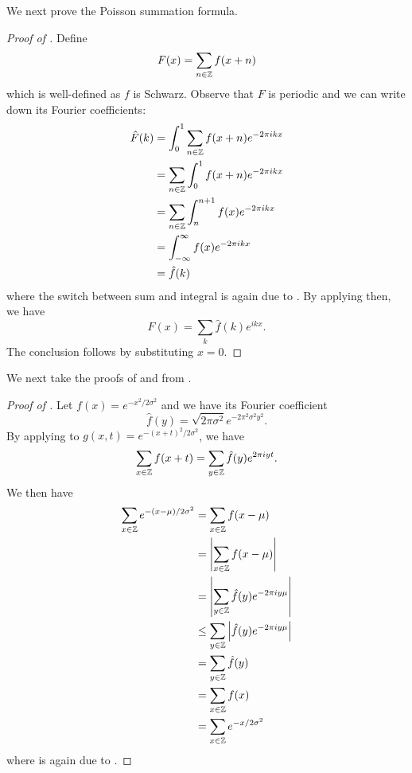 \documentclass{article}
\begin{document}
We next prove the Poisson summation formula.

\begin{proof}[Proof of ]
	Define
	\begin{equation}
		F(x)=\sum_{n\in\mathbb{Z}}f(x+n)
	\end{equation}
	which is well-defined as $f$ is Schwarz.
	Observe that $F$ is periodic and we can write down its Fourier coefficients:
	\begin{align}
		\hat{F}(k)&=\int_0^1 \sum_{n\in\mathbb{Z}} f(x+n)e^{-2\pi ikx} \\
		&=\sum_{n\in\mathbb{Z}} \int_0^1 f(x+n)e^{-2\pi ikx} \\
		&=\sum_{n\in\mathbb{Z}} \int_n^{n+1} f(x)e^{-2\pi ikx} \\
		&=\int_{-\infty}^{\infty} f(x)e^{-2\pi ikx} \\
		&=\hat{f}(k)
	\end{align}
	where the switch between sum and integral is again due to .
	By applying  then, we have
	\begin{equation}
		F(x)=\sum_k \hat{f}(k) e^{ikx}.
	\end{equation}
	The conclusion follows by substituting $x=0$.
\end{proof}

We next take the proofs of  and  from \cite{discrete-gaussian}.

\begin{proof}[Proof of ]
	Let $f(x)=e^{-x^2/2\sigma^2}$ and we have its Fourier coefficient
	\begin{equation}
		\hat{f}(y)=\sqrt{2\pi\sigma^2}e^{-2\pi^2\sigma^2y^2}.
	\end{equation}
	By applying  to $g(x, t)=e^{-(x+t)^2/2\sigma^2}$,
	we have
	\begin{equation}
		\sum_{x\in\mathbb{Z}}f(x+t)=\sum_{y\in\mathbb{Z}}\hat{f}(y)e^{2\pi iyt}.
	\end{equation}
	We then have
	\begin{align}
		\sum_{x\in\mathbb{Z}}e^{-(x-\mu)/2\sigma^2}
		&=\sum_{x\in\mathbb{Z}}f(x-\mu)\\
		&=\abs{\sum_{x\in\mathbb{Z}}f(x-\mu)} \\
		&=\abs{\sum_{y\in\mathbb{Z}}\hat{f}(y)e^{-2\pi iy\mu}} \\
		&\leq\sum_{y\in\mathbb{Z}}\abs{\hat{f}(y)e^{-2\pi iy\mu}} \\
		&=\sum_{y\in\mathbb{Z}}\hat{f}(y) \\
		&=\sum_{x\in\mathbb{Z}}f(x) \label{eq:use-Poisson} \\
		&=\sum_{x\in\mathbb{Z}}e^{-x/2\sigma^2}
	\end{align}
	where  is again due to .
\end{proof}
\end{document}
